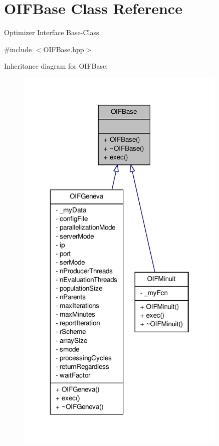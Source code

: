 \hypertarget{classOIFBase}{
\section{OIFBase Class Reference}
\label{d0/d31/classOIFBase}
}


Optimizer Interface Base-\/Class.  




{\ttfamily \#include $<$OIFBase.hpp$>$}



Inheritance diagram for OIFBase:\nopagebreak
\begin{figure}[H]
\begin{center}
\leavevmode
\includegraphics[width=286pt]{db/d8d/classOIFBase__inherit__graph}
\end{center}
\end{figure}
